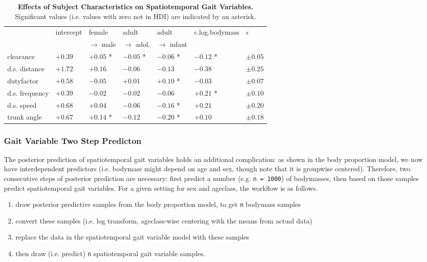 \begin{table}[p]
\caption{\label{tab:strideresults}\textbf{Effects of Subject Characteristics on Spatiotemporal Gait Variables.} Significant values (i.e. values with zero not in HDI) are indicated by an asterisk.}
\centering
\begin{small}
\begin{tabular}{|l|l|l|l|l|l|l|}
\hline
 & intercept & female  & adult  & adult  & c.log.bodymass & \(\epsilon\)\\[0pt]
 &  & \(\rightarrow\) male & \(\rightarrow\) adol. & \(\rightarrow\) infant &  & \\[0pt]
\hline
clearance & \(+0.39\) & \(+0.05\) * & \(-0.05\) * & \(-0.06\) * & \(-0.12\) * & \(\pm 0.05\)\\[0pt]
d.s. distance & \(+1.72\) & \(+0.16\) & \(-0.06\) & \(-0.13\) & \(-0.38\) & \(\pm 0.25\)\\[0pt]
dutyfactor & \(+0.58\) & \(-0.05\) & \(+0.01\) & \(+0.10\) * & \(-0.03\) & \(\pm 0.07\)\\[0pt]
d.s. frequency & \(+0.39\) & \(-0.02\) & \(-0.02\) & \(-0.06\) & \(+0.21\) * & \(\pm 0.10\)\\[0pt]
d.s. speed & \(+0.68\) & \(+0.04\) & \(-0.06\) & \(-0.16\) * & \(+0.21\) & \(\pm 0.20\)\\[0pt]
trunk angle & \(+0.67\) & \(+0.14\) * & \(-0.12\) & \(-0.20\) * & \(+0.10\) & \(\pm 0.18\)\\[0pt]
\hline
\end{tabular}
\end{small}
\end{table}


\subsubsection{Gait Variable Two Step Predicton}
\label{sec:org3879560}
The posterior prediction of spatiotemporal gait variables holds an additional complication: as shown in the body proportion model, we now have interdependent predictors (i.e. bodymass might depend on age and sex, though note that it is groupwise centered).
Therefore, two consecutive steps of posterior prediction are necessary: first predict a number (e.g. \texttt{n = 1000}) of bodymasses, then based on those samples predict spatiotemporal gait variables.
For a given setting for sex and ageclass, the workflow is as follows.
\begin{enumerate}
\item draw posterior predictive samples from the body proportion model, to get \texttt{n} bodymass samples
\item convert these samples (i.e. log transform, ageclass-wise centering with the means from actual data)
\item replace the data in the spatiotemporal gait variable model with these samples
\item then draw (i.e. predict) \texttt{n} spatiotemporal gait variable samples.
\end{enumerate}

